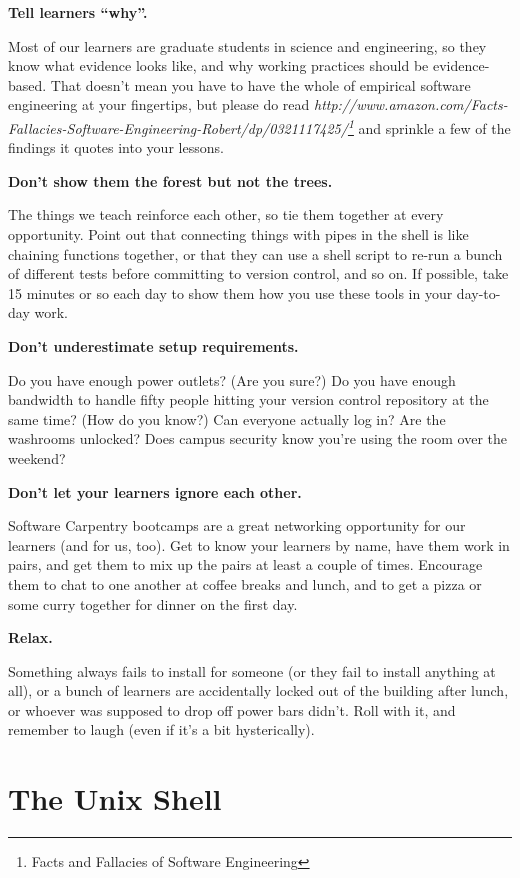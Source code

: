 \documentclass[]{book}
\newcommand{\urlfoot}[2]{{#1}\footnote{#2}}
\begin{document}
\textbf{Tell learners ``why''.}

Most of our learners are graduate students in science and engineering,
so they know what evidence looks like, and why working practices should
be evidence-based. That doesn't mean you have to have the whole of
empirical software engineering at your fingertips, but please do read
\emph{\urlfoot{http://www.amazon.com/Facts-Fallacies-Software-Engineering-Robert/dp/0321117425/}{Facts
and Fallacies of Software Engineering}} and sprinkle a few of the
findings it quotes into your lessons.

\textbf{Don't show them the forest but not the trees.}

The things we teach reinforce each other, so tie them together at every
opportunity. Point out that connecting things with pipes in the shell is
like chaining functions together, or that they can use a shell script to
re-run a bunch of different tests before committing to version control,
and so on. If possible, take 15 minutes or so each day to show them how
you use these tools in your day-to-day work.

\textbf{Don't underestimate setup requirements.}

Do you have enough power outlets? (Are you sure?) Do you have enough
bandwidth to handle fifty people hitting your version control repository
at the same time? (How do you know?) Can everyone actually log in? Are
the washrooms unlocked? Does campus security know you're using the room
over the weekend?

\textbf{Don't let your learners ignore each other.}

Software Carpentry bootcamps are a great networking opportunity for our
learners (and for us, too). Get to know your learners by name, have them
work in pairs, and get them to mix up the pairs at least a couple of
times. Encourage them to chat to one another at coffee breaks and lunch,
and to get a pizza or some curry together for dinner on the first day.

\textbf{Relax.}

Something always fails to install for someone (or they fail to install
anything at all), or a bunch of learners are accidentally locked out of
the building after lunch, or whoever was supposed to drop off power bars
didn't. Roll with it, and remember to laugh (even if it's a bit
hysterically).

\section{The Unix Shell}
\end{document}
